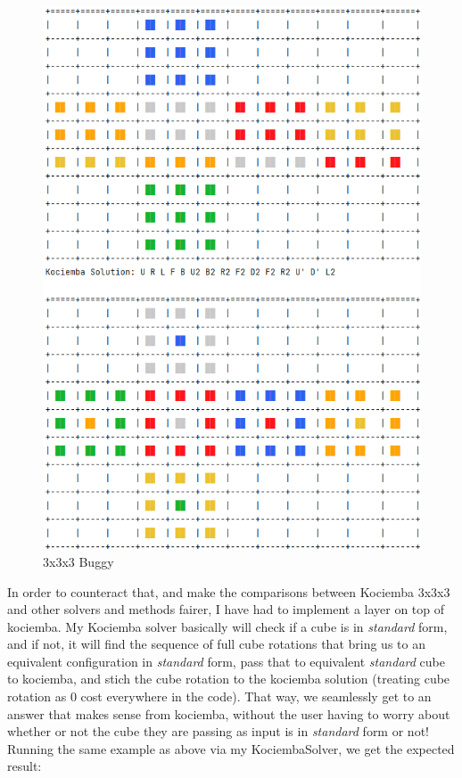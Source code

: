 \begin{figure}[H]
\centering
\includegraphics[scale=0.6]{./Figures/KociembaBug333}
\caption[Kociemba Bug]{3x3x3 Buggy}
\label{fig:KociembaBug333}
\end{figure}
In order to counteract that, and make the comparisons between Kociemba 3x3x3 and other solvers and methods fairer, I have had to implement a layer on top of kociemba. My Kociemba solver basically will check if a cube is in \textit{standard} form, and if not, it will find the sequence of full cube rotations that bring us to an equivalent configuration in \textit{standard} form, pass that to equivalent \textit{standard} cube to kociemba, and stich the cube rotation to the kociemba solution (treating cube rotation as 0 cost everywhere in the code). That way, we seamlessly get to an answer that makes sense from kociemba, without the user having to worry about whether or not the cube they are passing as input is in \textit{standard} form or not! Running the same example as above via my KociembaSolver, we get the expected result:

